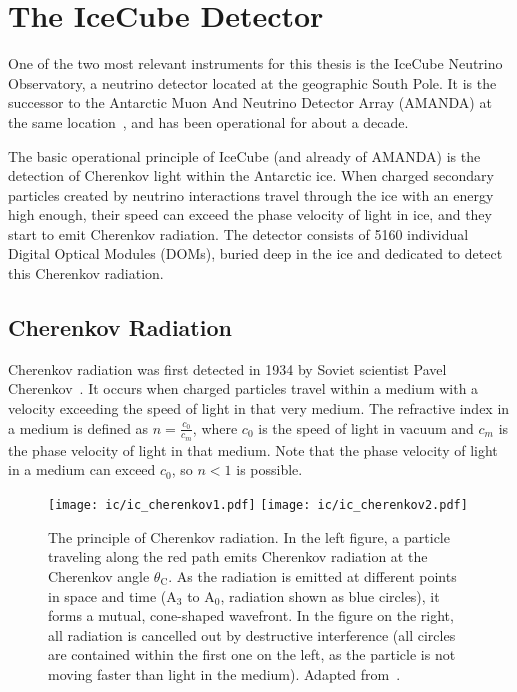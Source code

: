 \chapter{The IceCube Detector}\label{ic}
One of the two most relevant instruments for this thesis is the IceCube Neutrino Observatory, a neutrino detector located at the geographic South Pole. It is the successor to the Antarctic Muon And Neutrino Detector Array (AMANDA) at the same location~, and has been operational for about a decade.

The basic operational principle of IceCube (and already of AMANDA) is the detection of Cherenkov light within the Antarctic ice. When charged secondary particles created by neutrino interactions travel through the ice with an energy high enough, their speed can exceed the phase velocity of light in ice, and they start to emit Cherenkov radiation. The detector consists of 5160 individual Digital Optical Modules (DOMs), buried deep in the ice and dedicated to detect this Cherenkov radiation.

\section{Cherenkov Radiation}\label{cherenkov_radiation}

Cherenkov radiation was first detected in 1934 by Soviet scientist Pavel Cherenkov~. It occurs when charged particles travel within a medium with a velocity exceeding the speed of light in that very medium. The refractive index in a medium is defined as $n=\frac{c_0}{c_m}$, where $c_0$ is the speed of light in vacuum and $c_m$ is the phase velocity of light in that medium. Note that the phase velocity of light in a medium can exceed $c_0$, so $n<1$ is possible.

\begin{figure}
    \texttt{[image: ic/ic\_cherenkov1.pdf]}
    \texttt{[image: ic/ic\_cherenkov2.pdf]}
    \caption[Cherenkov radiation]{The principle of Cherenkov radiation. In the left figure, a particle traveling along the red path emits Cherenkov radiation at the Cherenkov angle $\theta_\text{C}$. As the radiation is emitted at different points in space and time ($\text{A}_3$ to $\text{A}_0$, radiation shown as blue circles), it forms a mutual, cone-shaped wavefront. In the figure on the right, all radiation is cancelled out by destructive interference (all circles are contained within the first one on the left, as the particle is not moving faster than light in the medium). Adapted from~\cite{LAnnunziata2020}.}
\end{figure}


